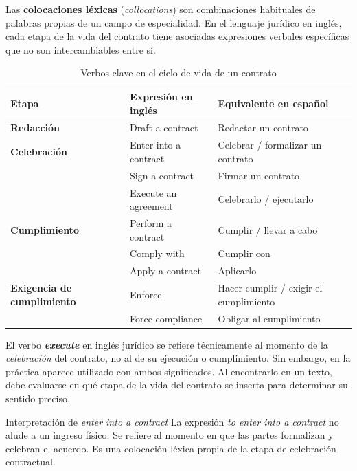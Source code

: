 \documentclass[12pt,oneside]{book}
\begin{document}
Las \textbf{colocaciones léxicas} (\textit{collocations}) son combinaciones
habituales de palabras propias de un campo de especialidad. En el lenguaje
jurídico en inglés, cada etapa de la vida del contrato tiene asociadas
expresiones verbales específicas que no son intercambiables entre sí.

\begin{table}[H]
\centering
\caption{Verbos clave en el ciclo de vida de un contrato}
\begin{tabularx}{\textwidth}{
    >{\raggedright\arraybackslash}p{}
    >{\raggedright\arraybackslash}p{}
    >{\raggedright\arraybackslash}X
}
\toprule
\textbf{Etapa} & \textbf{Expresión en inglés} & \textbf{Equivalente en español} \\
\midrule
\textbf{Redacción} & Draft a contract & Redactar un contrato \\
\addlinespace
\textbf{Celebración} & Enter into a contract & Celebrar / formalizar un contrato \\
 & Sign a contract & Firmar un contrato \\
 & Execute an agreement & Celebrarlo / ejecutarlo \\
\addlinespace
\textbf{Cumplimiento} & Perform a contract & Cumplir / llevar a cabo \\
 & Comply with & Cumplir con \\
 & Apply a contract & Aplicarlo \\
\addlinespace
\textbf{Exigencia de cumplimiento} & Enforce & Hacer cumplir / exigir el cumplimiento \\
 & Force compliance & Obligar al cumplimiento \\
\bottomrule
\end{tabularx}
\end{table}

\begin{important}
El verbo \textbf{\textit{execute}} en inglés jurídico se refiere
técnicamente al momento de la \emph{celebración} del contrato, no al
de su ejecución o cumplimiento. Sin embargo, en la práctica aparece
utilizado con ambos significados. Al encontrarlo en un texto, debe
evaluarse en qué etapa de la vida del contrato se inserta para
determinar su sentido preciso.
\end{important}

\begin{example}{Interpretación de \textit{enter into a contract}}
La expresión \textit{to enter into a contract} no alude a un ingreso
físico. Se refiere al momento en que las partes formalizan y celebran el
acuerdo. Es una colocación léxica propia de la etapa de celebración
contractual.
\end{example}
\end{document}
